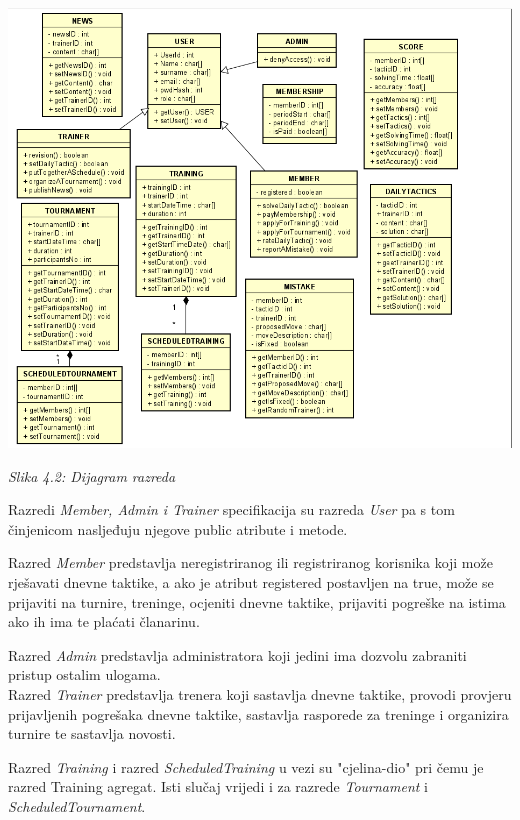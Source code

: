 \documentclass{article}
\begin{document}
	\includegraphics[width=\columnwidth]{slike/dijagramRazreda.PNG}
		\begin{center}
			\textit{Slika 4.2: Dijagram razreda}
		\end{center}
	
	Razredi \textit{Member, Admin i Trainer} specifikacija su razreda \textit{User} pa s tom činjenicom nasljeđuju njegove public atribute i metode.
	
	Razred \textit{Member} predstavlja neregistriranog ili registriranog korisnika koji može rješavati dnevne taktike, a ako je atribut registered postavljen na true, može se prijaviti na turnire, treninge, ocjeniti dnevne taktike, prijaviti pogreške na istima ako ih ima te plaćati članarinu.
	
	Razred \textit{Admin} predstavlja administratora koji jedini ima dozvolu zabraniti pristup ostalim ulogama.
	\\
	
	Razred \textit{Trainer} predstavlja trenera koji sastavlja dnevne taktike, provodi provjeru prijavljenih pogrešaka dnevne taktike, sastavlja rasporede za treninge i organizira turnire te sastavlja novosti.
	
	Razred \textit{Training} i razred \textit{ScheduledTraining} u vezi su "cjelina-dio" pri čemu je razred Training agregat. Isti slučaj vrijedi i za razrede \textit{Tournament} i \textit{ScheduledTournament}.
	
\end{document}

